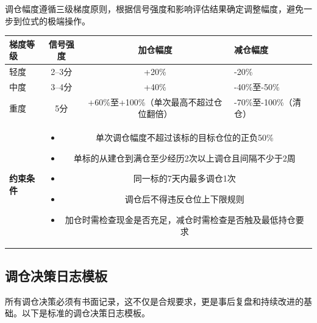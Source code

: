 调仓幅度遵循三级梯度原则，根据信号强度和影响评估结果确定调整幅度，避免一步到位式的极端操作。

\begin{exhibitbox}[表9-25：调仓幅度三级梯度规则]
\scriptsize
\setlength{\tabcolsep}{3pt}
\renewcommand{\arraystretch}{1.15}
\begin{tabularx}{\textwidth}{l c c X}
\toprule
\textbf{梯度等级} & \textbf{信号强度} & \textbf{加仓幅度} & \textbf{减仓幅度} \\
\midrule
轻度 & 2--3分 & +20\% & -20\% \\
中度 & 3--4分 & +40\% & -40\%至-50\% \\
重度 & 5分 & +60\%至+100\%（单次最高不超过仓位翻倍） & -70\%至-100\%（清仓） \\
\midrule
\textbf{约束条件} & \multicolumn{3}{X}{
\begin{itemize}[leftmargin=1.2em]
\item 单次调仓幅度不超过该标的目标仓位的正负50\%
\item 单标的从建仓到满仓至少经历2次以上调仓且间隔不少于2周
\item 同一标的7天内最多调仓1次
\item 调仓后不得违反仓位上下限规则
\item 加仓时需检查现金是否充足，减仓时需检查是否触及最低持仓要求
\end{itemize}
} \\
\bottomrule
\end{tabularx}
\end{exhibitbox}

\subsection{调仓决策日志模板}

所有调仓决策必须有书面记录，这不仅是合规要求，更是事后复盘和持续改进的基础。以下是标准的调仓决策日志模板。

